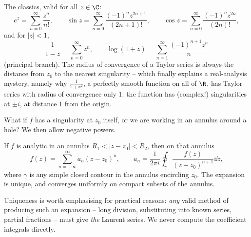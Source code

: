 \begin{example}
	The classics, valid for all $z \in \C$:
	$$
	e^z = \sum_{n=0}^\infty \frac{z^n}{n!}, \qquad
	\sin z = \sum_{n=0}^\infty \frac{(-1)^n z^{2n+1}}{(2n+1)!}, \qquad
	\cos z = \sum_{n=0}^\infty \frac{(-1)^n z^{2n}}{(2n)!},
	$$
	and for $|z| < 1$,
	$$
	\frac{1}{1 - z} = \sum_{n = 0}^\infty z^n, \qquad \log(1 + z) = \sum_{n=1}^\infty \frac{(-1)^{n+1} z^n}{n}
	$$
	(principal branch). The radius of convergence of a Taylor series is always the distance from $z_0$ to the nearest singularity -- which finally explains a real-analysis mystery, namely why $\frac{1}{1 + x^2}$, a perfectly smooth function on all of $\R$, has Taylor series with radius of convergence only $1$: the function has (complex!) singularities at $\pm i$, at distance $1$ from the origin.
\end{example}

What if $f$ has a singularity at $z_0$ itself, or we are working in an annulus around a hole? We then allow negative powers.

\begin{theorem}
	If $f$ is analytic in an annulus $R_1 < |z - z_0| < R_2$, then on that annulus
	$$
	f(z) = \sum_{n = -\infty}^{\infty} a_n (z - z_0)^n, \qquad a_n = \frac{1}{2\pi i} \oint_\gamma \frac{f(z)}{(z - z_0)^{n + 1}} \dd z,
	$$
	where $\gamma$ is any simple closed contour in the annulus encircling $z_0$. The expansion is unique, and converges uniformly on compact subsets of the annulus.
\end{theorem}

Uniqueness is worth emphasising for practical reasons: \emph{any} valid method of producing such an expansion -- long division, substituting into known series, partial fractions -- must give \emph{the} Laurent series. We never compute the coefficient integrals directly.

